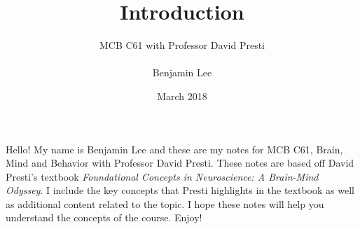\documentclass{article}
\title{Introduction}
\author{MCB C61 with Professor David Presti \\ \\ Benjamin Lee}
\date{March 2018}
\begin{document}
\maketitle

Hello! My name is Benjamin Lee and these are my notes for MCB C61, Brain, Mind and Behavior with Professor David Presti. These notes are based off David Presti's textbook \textit{Foundational Concepts in Neuroscience: A Brain-Mind Odyssey}. I include the key concepts that Presti highlights in the textbook as well as additional content related to the topic. I hope these notes will help you understand the concepts of the course. Enjoy!
\end{document}
